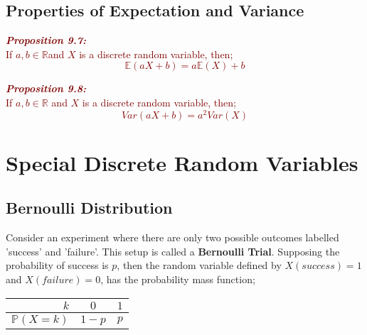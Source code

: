 \documentclass{report}
\newenvironment{cframedprop}[1][Maroon]
  {\begin{tcolorbox}[colframe=#1,colback=white]}
  {\end{tcolorbox}}
\begin{document}
\section{Properties of Expectation and Variance}

\begin{cframedprop}
    \textcolor{Maroon}{\textbf{\textit{Proposition 9.7:}}\\
    If $a,b \in \mathbb{R}$and $X$ is a discrete random variable, then;
    \begin{equation}
        \mathbb{E}(aX + b) = a\mathbb{E}(X) + b
    \end{equation}}
\end{cframedprop}

\begin{cframedprop}
    \textcolor{Maroon}{\textbf{\textit{Proposition 9.8:}}\\
    If $a,b \in \mathbb{R}$ and $X$ is a discrete random variable, then;
    \begin{equation}
        Var(aX + b) = a^2Var(X)
    \end{equation}}
\end{cframedprop}

\chapter{Special Discrete Random Variables}
\section{Bernoulli Distribution}

Consider an experiment where there are only two possible outcomes labelled 'success' and 'failure'. This setup is called a \textbf{Bernoulli Trial}. Supposing the probability of success is $p$, then the random variable defined by $X(success) = 1$ and $X(failure) = 0$, has the probability mass function;

\begin{table}[h!]
  \begin{center}
    \begin{tabular}{r|c|c} 
      $k$ & $0$ & $1$\\
      \hline
      $\mathbb{P}(X = k)$ & $1-p$ & $p$\\
    \end{tabular}
  \end{center}
\end{table}
\end{document}
